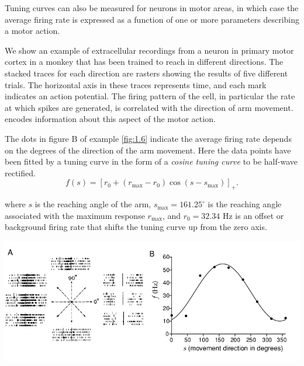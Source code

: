 \begin{rem}
  Tuning curves can also be measured for neurons in motor areas, in which
case the average firing rate is expressed as a function of one or more parameters describing 
a motor action.
\end{rem}

\begin{exm}
  \label{fig:1.6}
  We show an example of extracellular recordings from a neuron in primary motor cortex 
  in a monkey
  that has been trained to reach in different directions. The stacked traces for
  each direction are rasters showing the results of five different trials. The
  horizontal axis in these traces represents time, and each mark indicates
  an action potential. The firing pattern of the cell, in particular the rate at
  which spikes are generated, is correlated with the direction of arm movement.%
  encodes information about this aspect of the motor action.

  The dots in figure B of example \ref{fig:1.6} indicate the average firing rate depends 
  on the degrees of the direction of the arm movement.
  Here the data points have
  been fitted by a tuning curve in the form of a \emph{cosine tuning curve} to be half-wave 
  rectified.
\begin{equation}
    \label{equ:1.16}
    f(s)=[r_0+\left(r_{\text{max}}-r_0\right)\cos\left(s-s_{\text{max}}\right)]_+.
  \end{equation}

  where $s$ is the reaching angle of the arm, $s_{\text{max}}=161.25^\circ$ is the reaching 
  angle associated with the maximum response $r_{\text{max}}$, and $r_0=32.34$ Hz is an 
  offset or background
  firing rate that shifts the tuning curve up from the zero axis. 
  \begin{center}
    \includegraphics[scale=0.34]{./png/fig_1_6.png}
  \end{center}
\end{exm}


